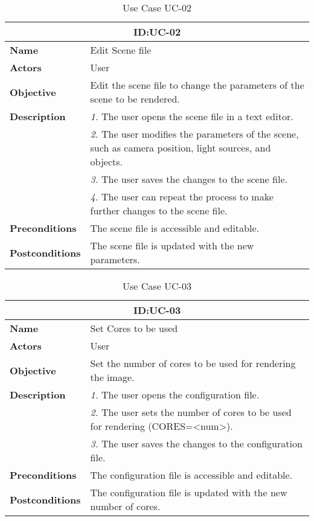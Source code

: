 \begin{table}[H]
    \centering
    \begin{tabular}{l p{10cm}}
        \toprule
        \multicolumn{2}{c}{\textbf{ID:\@ UC-02}} \\
        \toprule
        \textbf{Name}               &  Edit Scene file \\
        \textbf{Actors}             &  User \\
        \textbf{Objective}          &  Edit the scene file to change the parameters of the scene to be rendered. \\
        \textbf{Description}        & \textsl{1.} The user opens the scene file in a text editor. \\
                                   & \textsl{2.} The user modifies the parameters of the scene, such as camera position, light sources, and objects. \\
                                   & \textsl{3.} The user saves the changes to the scene file. \\
                                   & \textsl{4.} The user can repeat the process to make further changes to the scene file. \\
        \textbf{Preconditions}      &  The scene file is accessible and editable. \\
        \textbf{Postconditions}     &  The scene file is updated with the new parameters. \\
    \end{tabular}
    \caption{Use Case UC-02}\label{tab:uc-02}
\end{table} 

\begin{table}
    \centering
    \begin{tabular}{l p{10cm}}
        \toprule
        \multicolumn{2}{c}{\textbf{ID:\@ UC-03}} \\
        \toprule
        \textbf{Name}               &  Set Cores to be used \\
        \textbf{Actors}             &  User \\
        \textbf{Objective}          &  Set the number of cores to be used for rendering the image. \\
        \multirow{1}{*}{\textbf{Description}} & \textsl{1.} The user opens the configuration file.\\
                                             & \textsl{2.} The user sets the number of cores to be used for rendering (CORES=<num>).\\
                                             & \textsl{3.} The user saves the changes to the configuration file.\\
        \textbf{Preconditions}      &  The configuration file is accessible and editable. \\
        \textbf{Postconditions}     &  The configuration file is updated with the new number of cores. \\
    \end{tabular}
    \caption{Use Case UC-03}\label{tab:uc-03}
\end{table}


